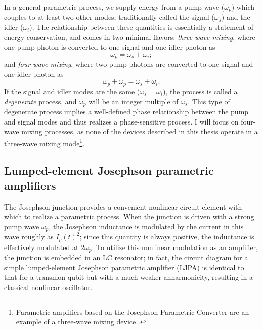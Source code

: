 In a general parametric process, we supply energy from a pump wave ($\omega_p$) which couples to at least two other modes, traditionally called the signal ($\omega_s$) and the idler ($\omega_i$).  The relationship between these quantities is essentially a statement of energy conservation, and comes in two minimal flavors: \textit{three-wave mixing}, where one pump photon is converted to one signal and one idler photon as
\begin{equation}
\omega_p = \omega_s + \omega_i;
\label{eq:3wave}
\end{equation}
and \textit{four-wave mixing}, where two pump photons are converted to one signal and one idler photon as
\begin{equation}
\omega_p + \omega_p = \omega_s + \omega_i.
\label{eq:4wave}
\end{equation}
If the signal and idler modes are the same ($\omega_s = \omega_i$), the process is called a \textit{degenerate} process, and $\omega_p$ will be an integer multiple of $\omega_s$.  This type of degenerate process implies a well-defined phase relationship between the pump and signal modes and thus realizes a phase-sensitive process.  I will focus on four-wave mixing processes, as none of the devices described in this thesis operate in a three-wave mixing mode\footnote{Parametric amplifiers based on the Josephson Parametric Converter are an example of a three-wave mixing device \cite{JPCNature}.}.

\subsection{Lumped-element Josephson parametric amplifiers}

The Josephson junction provides a convenient nonlinear circuit element with which to realize a parametric process.  When the junction is driven with a strong pump wave $\omega_p$, the Josephson inductance is modulated by the current in this wave roughly as $I_p(t)^2$; since this quantity is always positive, the inductance is effectively modulated at $2 \omega_p$.  To utilize this nonlinear modulation as an amplifier, the junction is embedded in an LC resonator; in fact, the circuit diagram for a simple lumped-element Josephson parametric amplifier (LJPA) is identical to that for a transmon qubit \cite{PhysRevA.86.013814} but with a much weaker anharmonicity, resulting in a classical nonlinear oscillator.

